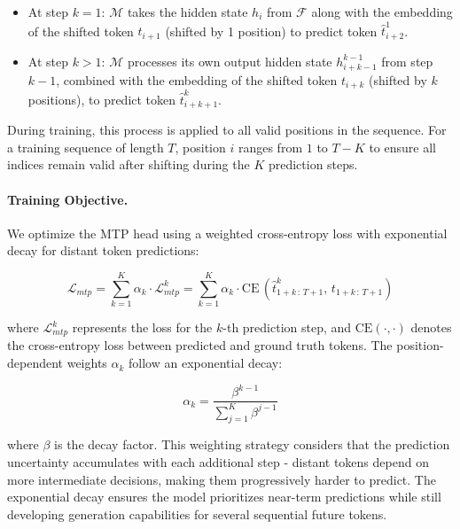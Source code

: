 \documentclass{article} %
\begin{document}
\begin{itemize}

    \item At step $k=1$: $\mathcal{M}$ takes the hidden state $h_i$ from $\mathcal{F}$ along with the embedding of the shifted token $t_{i+1}$ (shifted by 1 position) to predict token $\hat{t}^1_{i+2}$.
    
    \item At step $k>1$: $\mathcal{M}$ processes its own output hidden state $h^{k-1}_{i+k-1}$ from step $k-1$, combined with the embedding of the shifted token $t_{i+k}$ (shifted by $k$ positions), to predict token $\hat{t}^k_{i+k+1}$.
    
\end{itemize}

During training, this process is applied to all valid positions in the sequence. For a training sequence of length $T$, position $i$ ranges from $1$ to $T-K$ to ensure all indices remain valid after shifting during the $K$ prediction steps.

\paragraph{Training Objective.} We optimize the MTP head using a weighted cross-entropy loss with exponential decay for distant token predictions:

\begin{equation}
    \mathcal{L}_{mtp} = \sum_{k=1}^{K} \alpha_k \cdot \mathcal{L}_{mtp}^k = \sum_{k=1}^{K} \alpha_k \cdot \text{CE}\,(\hat{t}^k_{1+k\,:\,T+1}, \,t_{1+k\,:\,T+1})
\end{equation}

where $\mathcal{L}_{mtp}^k$ represents the loss for the $k$-th prediction step, and $\text{CE}(\cdot, \cdot)$ denotes the cross-entropy loss between predicted and ground truth tokens. The position-dependent weights $\alpha_k$ follow an exponential decay:

\begin{equation}
    \alpha_k = \frac{\beta^{k-1}}{\sum_{j=1}^{K} \beta^{j-1}}
\end{equation}

where $\beta$ is the decay factor. This weighting strategy considers that the prediction uncertainty accumulates with each additional step - distant tokens depend on more intermediate decisions, making them progressively harder to predict. The exponential decay ensures the model prioritizes near-term predictions while still developing generation capabilities for several sequential future tokens.
\end{document}
